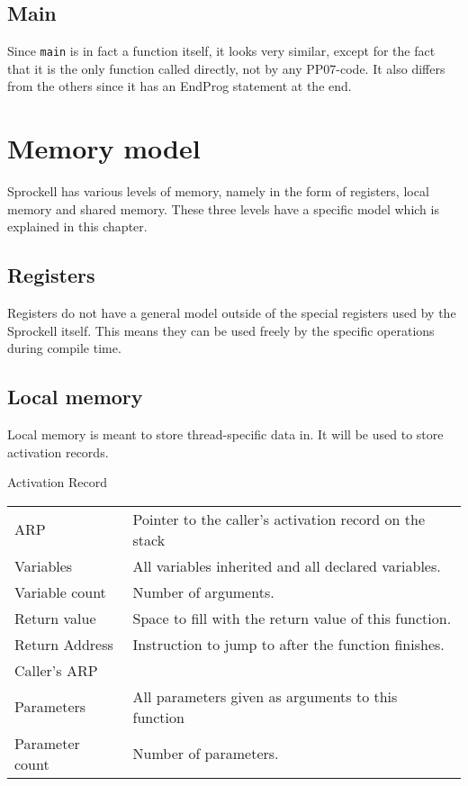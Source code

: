 \documentclass[10pt,a4paper]{report}
\begin{document}
\subsection{Main}
Since \texttt{main} is in fact a function itself, it looks very similar, except for the fact that it is the only function called directly, not by any PP07-code. It also differs from the others since it has an EndProg statement at the end.

\section{Memory model}
Sprockell has various levels of memory, namely in the form of registers, local memory and shared memory. These three levels have a specific model which is explained in this chapter.

\subsection{Registers}
Registers do not have a general model outside of the special registers used by the Sprockell itself. This means they can be used freely by the specific operations during compile time.

\subsection{Local memory}
Local memory is meant to store thread-specific data in. It will be used to store activation records. 

\label{fig:actrecord}
Activation Record
 
\begin{tabular}{| l || l |}
\hline
	ARP & Pointer to the caller's activation record on the stack\\
	Variables & All variables inherited and all declared variables.\\
	Variable count & Number of arguments. \\
	Return value & Space to fill with the return value of this function.\\
	Return Address & Instruction to jump to after the function finishes.\\
	Caller's ARP & \\
	Parameters & All parameters given as arguments to this function\\
	Parameter count & Number of parameters. \\
\hline
\end{tabular}
\end{document}
